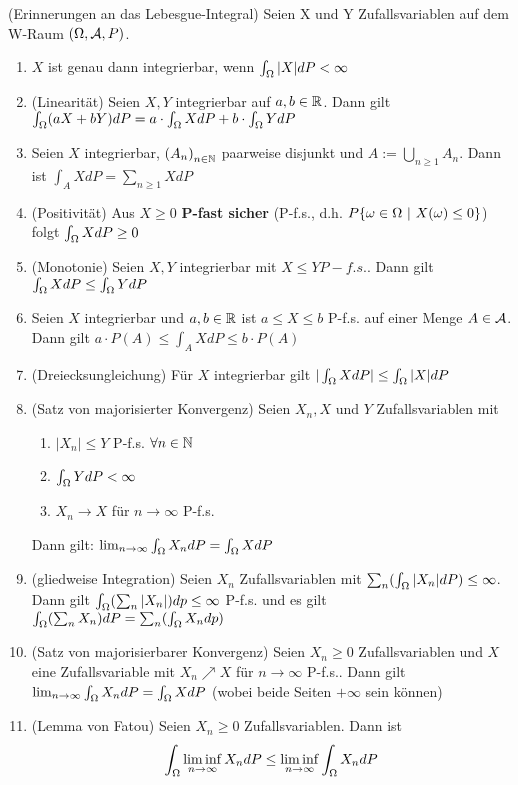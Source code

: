 \documentclass[parskip = full, 12pt]{scrartcl}
\begin{document}
\label{ss: Satz 4.7}
	(Erinnerungen an das Lebesgue-Integral) Seien X und Y Zufallsvariablen auf dem
	W-Raum $(\Omega, \mathcal{A}, P)$.
	\begin{enumerate}
		\item $X$ ist genau dann integrierbar, wenn $\int_\Omega |X| dP < \infty$
		\item (Linearität) Seien $X,Y$ integrierbar auf $a,b \in \mathbb{R}$. Dann gilt
			$\int_\Omega (aX + bY) dP = a \cdot \int_\Omega X dP + b \cdot \int_\Omega Y dP$
		\item Seien $X$ integrierbar, ${(A_n)}_{n \in \mathbb{N}}$ paarweise disjunkt und
			$A := \bigcup_{n \geq 1} A_n$. Dann ist $\int_A X dP = \sum_{n \geq 1} X
			dP$
		\item (Positivität) Aus $X \geq 0$ \textbf{P-fast sicher} (P-f.s., d.h. $
			P\{ \omega \in \Omega\ |\ X(\omega) \leq 0 \}$) folgt $\int_\Omega X dP \geq 0$
		\item (Monotonie) Seien $X, Y$ integrierbar mit $X \leq Y P-f.s.$. Dann gilt
			$\int_\Omega X dP \leq \int_\Omega Y dP$
		\item Seien $X$ integrierbar und $a,b \in \mathbb{R}$ ist $a \leq X \leq b$ 
			P-f.s. auf einer Menge $A \in \mathcal{A}$. Dann gilt $a \cdot P(A) \leq \int_A
			X dP \leq b \cdot P(A)$
		\item (Dreiecksungleichung) Für $X$ integrierbar gilt $| \int_\Omega X dP |
			\leq \int_\Omega |X| dP$ 
		\item (Satz von majorisierter Konvergenz) Seien $X_n, X$ und $Y$ 
			Zufallsvariablen mit 
			\begin{enumerate}
				\item ${|X_n| \leq Y}$ P-f.s. $\forall n \in \mathbb{N}$
				\item $\int_\Omega Y	dP < \infty$
				\item $X_n \rightarrow X$ für $n \rightarrow \infty$ P-f.s.
			\end{enumerate}  
			Dann gilt: $\lim_{n \rightarrow \infty} \int_\Omega X_n dP = \int_\Omega X dP$
		\item (gliedweise Integration) Seien $X_n$ Zufallsvariablen mit $\sum_n 
			(\int_\Omega |X_n| dP) \leq \infty$. Dann gilt $\int_\Omega (\sum_n |X_n|) dp 
			\leq  \infty$ P-f.s. und es gilt $\int_\Omega (\sum_n X_n) dP = \sum_n (\int
			_\Omega X_n dp)$
		\item (Satz von majorisierbarer Konvergenz) Seien $X_n \geq 0$
			Zufallsvariablen und $X$ eine Zufallsvariable mit $X_n \nearrow X$ für $
			n \rightarrow \infty$ P-f.s.. Dann gilt $\lim_{n \rightarrow \infty}
			\int_\Omega X_n dP = \int_\Omega X dP$ (wobei beide Seiten $+ \infty$ sein 
			können)
		\item (Lemma von Fatou) Seien $X_n \geq 0$ Zufallsvariablen. Dann ist
			$$ \int_\Omega \liminf_{n \rightarrow \infty} X_n dP \leq \liminf_{n 
			\rightarrow \infty} \int_\Omega X_n dP$$
	\end{enumerate}
\end{document}
